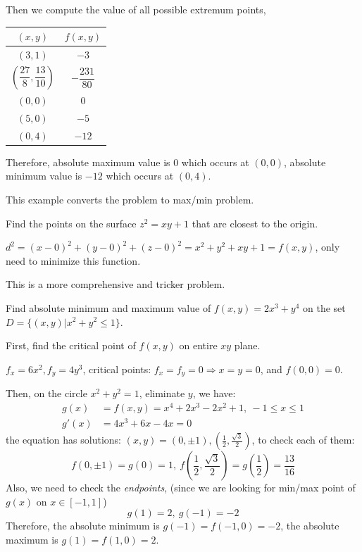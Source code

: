\begin{spacing}{1.3}
    Then we compute the value of all possible extremum points,
    \begin{center}
        \begin{tabular}{c|c}\hline\hline
            $(x,y)$ & $f(x,y)$ \\\hline\hline
            $(3,1)$ & $-3$\\\hline
            $\left(\dfrac{27}{8}, \dfrac{13}{10}\right)$ & $-\dfrac{231}{80}$\\\hline
            $(0,0)$ & 0 \\\hline
            $(5,0)$ & $-5$ \\\hline
            $(0,4)$ & $-12$ \\\hline
        \end{tabular}
    \end{center}

    Therefore, absolute maximum value is 0 which occurs at $(0,0)$,
    absolute minimum value is $-12$ which occurs at $(0,4)$. 


    \vspace{0.2in}
    {\blue This example converts the problem to max/min problem.}

    \eg Find the points on the surface $z^2=xy+1$ that are closest to the origin.

    \sol $d^2=(x-0)^2+(y-0)^2+(z-0)^2=x^2+y^2+xy+1=f(x,y)$, only need to minimize this function.


    \newpage
    {\blue This is a more comprehensive and tricker problem.}

    \eg Find absolute minimum and maximum value of $f(x,y)=2x^3+y^4$ on the set 
    $D=\{(x,y)|x^2+y^2\le 1\}$.

    \sol First, find the critical point of $f(x,y)$ on entire $xy$ plane.

    $f_x=6x^2, f_y=4y^3$, critical points: $f_x=f_y=0\Rightarrow x=y=0$, and $f(0,0)=0$.

    Then, on the circle $x^2+y^2=1$, eliminate $y$, we have:
    \begin{align*}
        g(x) &= f(x,y)=x^4+2x^3-2x^2+1,\ -1\le x\le 1\\
        g'(x) &= 4x^3+6x-4x=0
    \end{align*}
    the equation has solutions: $(x,y)=(0, \pm 1), \left(\frac{1}{2}, \frac{\sqrt{3}}{2}\right)$,
    to check each of them:
    $$f(0, \pm 1)=g(0)=1,\ f\left(\frac{1}{2}, \frac{\sqrt{3}}{2}\right)=g\left(\frac{1}{2}\right)=\frac{13}{16}$$
    Also, we need to check the {\it endpoints}, (since we are looking for min/max point of $g(x)$ on $x\in [-1,1]$)
    $$g(1)=2,\ g(-1)=-2$$
    Therefore, the absolute minimum is $g(-1)=f(-1,0)=-2$, the absolute maximum is $g(1)=f(1,0)=2$.


\end{spacing}
